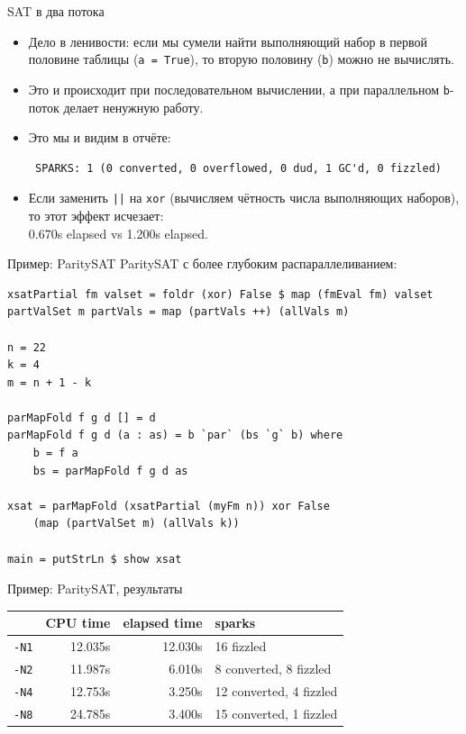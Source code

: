 \documentclass[xcolor=dvipsnames]{beamer}
\begin{document}
\begin{frame}[fragile]{SAT в два потока}

\begin{itemize}[<+->]
 \item Дело в ленивости: если мы сумели найти выполняющий набор в первой половине таблицы ({\tt a = True}), то вторую половину ({\tt b}) можно не вычислять.
 \item Это и происходит при последовательном вычислении, а при параллельном {\tt b}-поток делает ненужную работу.
 \item Это мы и видим в отчёте:
{\scriptsize
\begin{verbatim}
 SPARKS: 1 (0 converted, 0 overflowed, 0 dud, 1 GC'd, 0 fizzled)
\end{verbatim}

}
\item Если заменить {\tt ||} на {\tt xor} (вычисляем чётность числа выполняющих наборов), то этот эффект исчезает: \\ 0.670s elapsed vs 1.200s elapsed.
\end{itemize}

\end{frame}

\begin{frame}[fragile]{Пример: ParitySAT}
ParitySAT с более глубоким распараллеливанием:

{\footnotesize
\begin{verbatim}
xsatPartial fm valset = foldr (xor) False $ map (fmEval fm) valset
partValSet m partVals = map (partVals ++) (allVals m)

n = 22
k = 4
m = n + 1 - k

parMapFold f g d [] = d
parMapFold f g d (a : as) = b `par` (bs `g` b) where
    b = f a
    bs = parMapFold f g d as

xsat = parMapFold (xsatPartial (myFm n)) xor False 
    (map (partValSet m) (allVals k))

main = putStrLn $ show xsat
\end{verbatim}

 }
\end{frame}


\begin{frame}{Пример: ParitySAT, результаты}
 
 \begin{center}
 \begin{tabular}{|l|r|r|l|}\hline
  & CPU time & elapsed time & sparks \\\hline
  {\tt -N1} & 12.035s & 12.030s & 16 fizzled \\
  {\tt -N2} & 11.987s &
  6.010s & 8 converted, 8 fizzled \\
  {\tt -N4} & 12.753s &
  3.250s & 12 converted, 4 fizzled \\
  {\tt -N8} & 24.785s &
  3.400s & 15 converted, 1 fizzled \\\hline
 \end{tabular}

 \end{center}

\end{frame}
\end{document}
